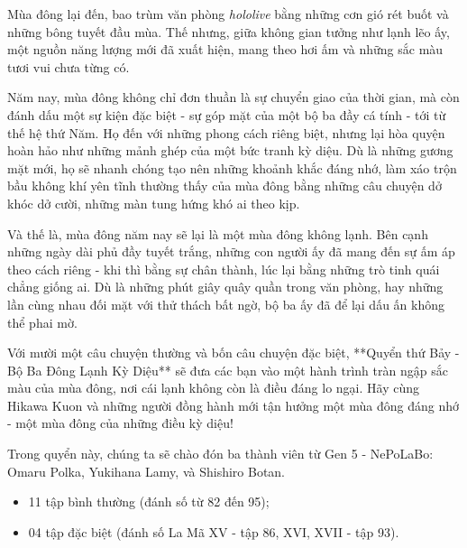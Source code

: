 \documentclass[main.tex]{subfiles}
\begin{document}
Mùa đông lại đến, bao trùm văn phòng \textit{hololive} bằng những cơn gió rét buốt và những bông tuyết đầu mùa. Thế nhưng, giữa không gian tưởng như lạnh lẽo ấy, một nguồn năng lượng mới đã xuất hiện, mang theo hơi ấm và những sắc màu tươi vui chưa từng có.

Năm nay, mùa đông không chỉ đơn thuần là sự chuyển giao của thời gian, mà còn đánh dấu một sự kiện đặc biệt - sự góp mặt của một bộ ba đầy cá tính - tới từ thế hệ thứ Năm. Họ đến với những phong cách riêng biệt, nhưng lại hòa quyện hoàn hảo như những mảnh ghép của một bức tranh kỳ diệu. Dù là những gương mặt mới, họ sẽ nhanh chóng tạo nên những khoảnh khắc đáng nhớ, làm xáo trộn bầu không khí yên tĩnh thường thấy của mùa đông bằng những câu chuyện dở khóc dở cười, những màn tung hứng khó ai theo kịp.

Và thế là, mùa đông năm nay sẽ lại là một mùa đông không lạnh. Bên cạnh những ngày dài phủ đầy tuyết trắng, những con người ấy đã mang đến sự ấm áp theo cách riêng - khi thì bằng sự chân thành, lúc lại bằng những trò tinh quái chẳng giống ai. Dù là những phút giây quây quần trong văn phòng, hay những lần cùng nhau đối mặt với thử thách bất ngờ, bộ ba ấy đã để lại dấu ấn không thể phai mờ.

Với mười một câu chuyện thường và bốn câu chuyện đặc biệt, **Quyển thứ Bảy - Bộ Ba Đông Lạnh Kỳ Diệu** sẽ đưa các bạn vào một hành trình tràn ngập sắc màu của mùa đông, nơi cái lạnh không còn là điều đáng lo ngại. Hãy cùng Hikawa Kuon và những người đồng hành mới tận hưởng một mùa đông đáng nhớ - một mùa đông của những điều kỳ diệu!

Trong quyển này, chúng ta sẽ chào đón ba thành viên từ Gen 5 - NePoLaBo: Omaru Polka, Yukihana Lamy, và Shishiro Botan.

{}
\begin{itemize}
    \item 11 tập bình thường (đánh số từ 82 đến 95);
    \item 04 tập đặc biệt (đánh số La Mã XV - tập 86, XVI, XVII - tập 93).

\end{itemize}
\end{document}
